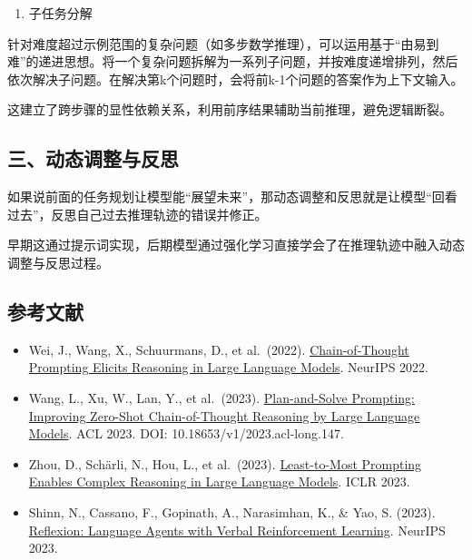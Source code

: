 \begin{enumerate}
\def\labelenumi{\arabic{enumi}.}
\setcounter{enumi}{1}
\tightlist
\item
  子任务分解
\end{enumerate}

针对难度超过示例范围的复杂问题（如多步数学推理），可以运用基于``由易到难''的递进思想。将一个复杂问题拆解为一系列子问题，并按难度递增排列，然后依次解决子问题。在解决第k个问题时，会将前k-1个问题的答案作为上下文输入。

这建立了跨步骤的显性依赖关系，利用前序结果辅助当前推理，避免逻辑断裂。

\hypertarget{ux4e09ux52a8ux6001ux8c03ux6574ux4e0eux53cdux601d}{%
\subsection{三、动态调整与反思}\label{ux4e09ux52a8ux6001ux8c03ux6574ux4e0eux53cdux601d}}

如果说前面的任务规划让模型能``展望未来''，那动态调整和反思就是让模型``回看过去''，反思自己过去推理轨迹的错误并修正。

早期这通过提示词实现，后期模型通过强化学习直接学会了在推理轨迹中融入动态调整与反思过程。

\FloatBarrier
{}
\hypertarget{ux53c2ux8003ux6587ux732e-119}{%
\subsection{参考文献}\label{ux53c2ux8003ux6587ux732e-119}}

\vspace{0.25em}
\begin{itemize}
\tightlist
\item
  Wei, J., Wang, X., Schuurmans, D., et al.~(2022). \href{https://arxiv.org/abs/2201.11903}{Chain-of-Thought Prompting Elicits Reasoning in Large Language Models}. NeurIPS 2022.
\item
  Wang, L., Xu, W., Lan, Y., et al.~(2023). \href{https://aclanthology.org/2023.acl-long.147/}{Plan-and-Solve Prompting: Improving Zero-Shot Chain-of-Thought Reasoning by Large Language Models}. ACL 2023. DOI: 10.18653/v1/2023.acl-long.147.
\item
  Zhou, D., Schärli, N., Hou, L., et al.~(2023). \href{https://openreview.net/forum?id=WZH7099tgfM}{Least-to-Most Prompting Enables Complex Reasoning in Large Language Models}. ICLR 2023.
\item
  Shinn, N., Cassano, F., Gopinath, A., Narasimhan, K., \& Yao, S. (2023). \href{https://arxiv.org/abs/2303.11366}{Reflexion: Language Agents with Verbal Reinforcement Learning}. NeurIPS 2023.
\end{itemize}

\clearpage
